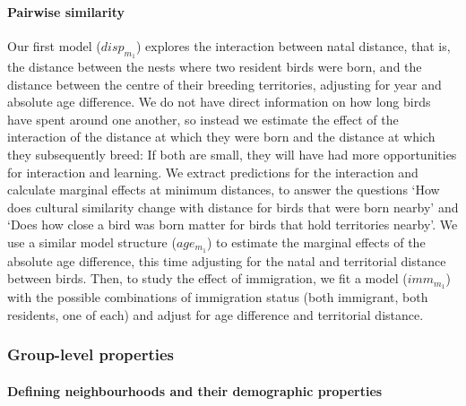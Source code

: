 \paragraph{Pairwise similarity}
Our first model ($disp_{m_1}$) explores the interaction between natal distance, that is, the distance between the nests where two resident birds were born, and the distance between the centre of their breeding territories, adjusting for year and absolute age difference. We do not have direct information on how long birds have spent around one another, so instead we estimate the effect of the interaction of the distance at which they were born and the distance at which they subsequently breed: If both are small, they will have had more opportunities for interaction and learning. We extract predictions for the interaction and calculate marginal effects at minimum distances, to answer the questions ‘How does cultural similarity change with distance for birds that were born nearby’ and ‘Does how close a bird was born matter for birds that hold territories nearby’. We use a similar model structure ($age_{m_1}$) to estimate the marginal effects of the absolute age difference, this time adjusting for the natal and territorial distance between birds. Then, to study the effect of immigration, we fit a model ($imm_{m_1}$) with the possible combinations of immigration status (both immigrant, both residents, one of each) and adjust for age difference and territorial distance. 


\subsubsection{Group-level properties}

\paragraph{Defining neighbourhoods and their demographic properties}

